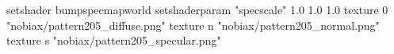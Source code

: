 setshader bumpspecmapworld
setshaderparam "specscale" 1.0 1.0 1.0
   texture 0 "nobiax/pattern205_diffuse.png"
   texture n "nobiax/pattern205_normal.png"
   texture s "nobiax/pattern205_specular.png"